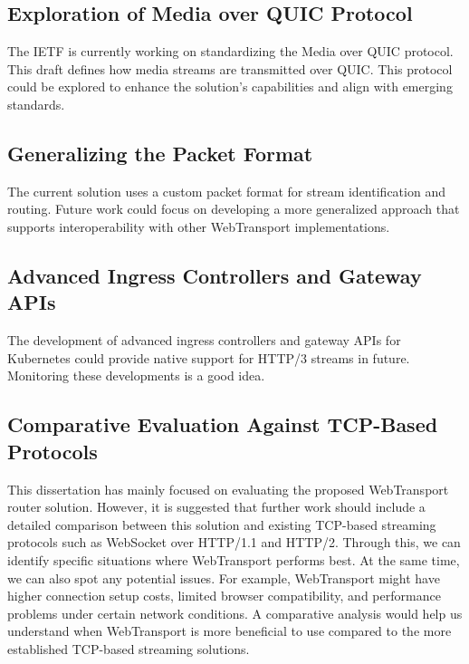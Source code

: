 \subsection{Exploration of Media over QUIC Protocol}
The IETF is currently working on standardizing the Media over QUIC protocol. This draft defines how media streams are transmitted over QUIC. This protocol could be explored to enhance the solution's capabilities and align with emerging standards.

\subsection{Generalizing the Packet Format}
The current solution uses a custom packet format for stream identification and routing. Future work could focus on developing a more generalized approach that supports interoperability with other WebTransport implementations.

\subsection{Advanced Ingress Controllers and Gateway APIs}
The development of advanced ingress controllers and gateway APIs for Kubernetes could provide native support for HTTP/3 streams in future. Monitoring these developments is a good idea.

\subsection{Comparative Evaluation Against TCP-Based Protocols}
This dissertation has mainly focused on evaluating the proposed WebTransport router solution. However, it is suggested that further work should include a detailed comparison between this solution and existing TCP-based streaming protocols such as WebSocket over HTTP/1.1 and HTTP/2. Through this, we can identify specific situations where WebTransport performs best. At the same time, we can also spot any potential issues. For example, WebTransport might have higher connection setup costs, limited browser compatibility, and performance problems under certain network conditions. A comparative analysis would help us understand when WebTransport is more beneficial to use compared to the more established TCP-based streaming solutions.




